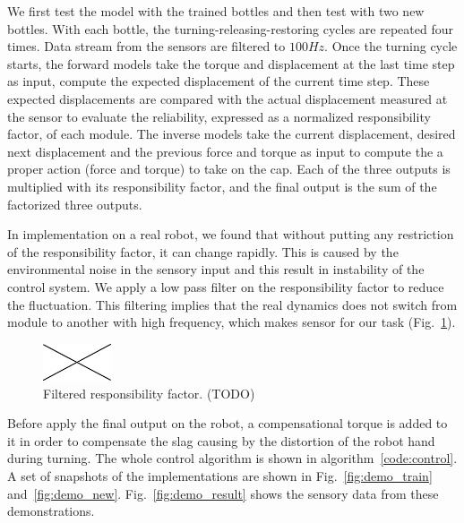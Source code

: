 We first test the model with the trained bottles and then test with two new bottles. With each bottle, the turning-releasing-restoring cycles are repeated four times. Data stream from the sensors are filtered to $100Hz$. Once the turning cycle starts, the forward models take the torque and displacement at the last time step as input, compute the expected displacement of the current time step. These expected displacements are compared with the actual displacement measured at the sensor to evaluate the reliability, expressed as a normalized responsibility factor, of each module. The inverse models take the current displacement, desired next displacement and the previous force and torque as input to compute the a proper action (force and torque) to take on the cap. Each of the three outputs is multiplied with its responsibility factor, and the final output is the sum of the factorized three outputs.

In implementation on a real robot, we found that without putting any restriction of the responsibility factor, it can change rapidly. This is caused by the environmental noise in the sensory input and this result in instability of the control system. We apply a low pass filter on the responsibility factor to reduce the fluctuation. This filtering implies that the real dynamics does not switch from module to another with high frequency, which makes sensor for our task (Fig.~\ref{fig:rf}).


\begin{figure}
  \centering
  \includegraphics[width=2cm]{./fig/void.jpg}
  \caption{ \scriptsize{Filtered responsibility factor. (TODO)}
}
\label{fig:rf}
\end{figure}

Before apply the final output on the robot, a compensational torque is added to it in order to compensate the slag causing by the distortion of the robot hand during turning. The whole control algorithm is shown in algorithm~\ref{code:control}. A set of snapshots of the implementations are shown in Fig.~\ref{fig:demo_train} and~\ref{fig:demo_new}.
Fig.~\ref{fig:demo_result} shows the sensory data from these demonstrations.

